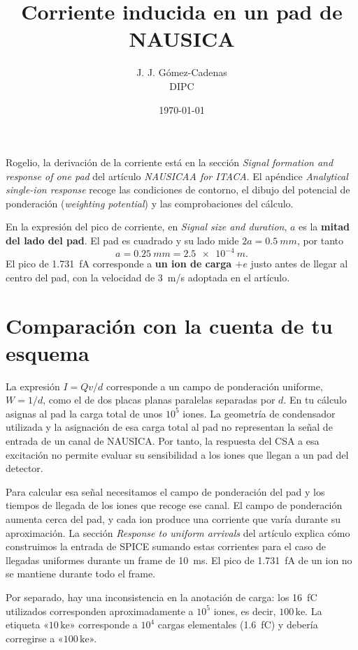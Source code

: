 \documentclass[11pt,a4paper]{article}
\title{Corriente inducida en un pad de NAUSICA}
\author{J. J. G\'omez-Cadenas\\{\small DIPC}}
\date{\today}
\newcommand{\PadSide}{0.5}
\newcommand{\PadHalf}{0.25}
\newcommand{\GapSpeed}{3}
\newcommand{\PeakCurrent}{1.731}
\newcommand{\FrameTime}{10}
\newcommand{\ExampleCharge}{1.6}
\begin{document}
\maketitle
Rogelio, la derivación de la corriente está en la sección
\emph{Signal formation and response of one pad} del artículo
\emph{NAUSICAA for ITACA}. El apéndice \emph{Analytical single-ion response}
recoge las condiciones de contorno, el dibujo del potencial de ponderación
(\emph{weighting potential}) y las comprobaciones del cálculo.

En la expresión del pico de corriente, en \emph{Signal size and duration},
$a$ es la \textbf{mitad del lado del pad}. El pad es cuadrado y su lado mide
$2a=\SI{\PadSide}{mm}$, por tanto
\[
 \boxed{a=\SI{\PadHalf}{mm}=\SI{2.5e-4}{m}.}
\]
El pico de \SI{\PeakCurrent}{fA} corresponde a \textbf{un ion de carga $+e$}
justo antes de llegar al centro del pad, con la velocidad de
\SI{\GapSpeed}{m/s} adoptada en el artículo.

\section*{Comparación con la cuenta de tu esquema}
La expresión $I=Qv/d$ corresponde a un campo de ponderación uniforme,
$W=1/d$, como el de dos placas planas paralelas separadas por $d$.
En tu cálculo asignas al pad la carga total de unos $10^5$ iones.
La geometría de condensador utilizada y la asignación de esa carga total
al pad no representan la señal de entrada de un canal de NAUSICA.
Por tanto, la respuesta del CSA a esa excitación no permite evaluar su
sensibilidad a los iones que llegan a un pad del detector.

Para calcular esa señal necesitamos el campo de ponderación del pad y
los tiempos de llegada de los iones que recoge ese canal. El campo de
ponderación aumenta cerca del pad, y cada ion produce una corriente que
varía durante su aproximación. La sección \emph{Response to uniform arrivals}
del artículo explica cómo construimos la entrada de SPICE sumando estas
corrientes para el caso de llegadas uniformes durante un frame de
\SI{\FrameTime}{ms}. El pico de \SI{\PeakCurrent}{fA} de un ion no se
mantiene durante todo el frame.

Por separado, hay una inconsistencia en la anotación de carga: los
\SI{16}{fC} utilizados corresponden aproximadamente a $10^5$ iones,
es decir, $100\,\mathrm{ke}$. La etiqueta «$10\,\mathrm{ke}$» corresponde
a $10^4$ cargas elementales (\SI{\ExampleCharge}{fC}) y debería corregirse
a «$100\,\mathrm{ke}$».
\end{document}
